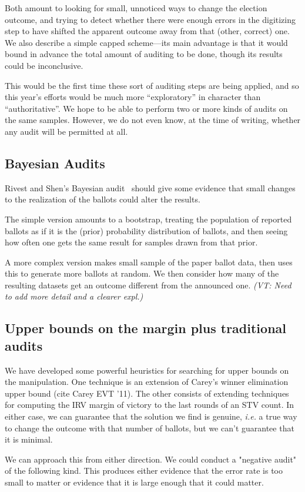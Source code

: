 \documentclass[10pt,a4paper]{article}
\newcommand{\VTNote}[1]{{\it(VT: #1)}}
\begin{document}
Both amount to looking for small, unnoticed ways to change the election outcome, and trying to detect whether there were enough errors in the digitizing step to have shifted the apparent outcome away from that (other, correct) one. We also describe a simple capped scheme---its main advantage is that it would bound in advance the total amount of auditing to be done, though its results could be inconclusive. 

This would be the first time these sort of auditing steps are
being applied, and so this year's efforts would be much more
``exploratory'' in character than ``authoritative''.  We hope to be able to perform two or more kinds of audits on the same samples.  However, we do not even know, at the time of writing, whether any audit will be permitted at all.  
\subsection{Bayesian Audits} Rivest and Shen's Bayesian audit~\cite{rivest2012bayesian} should give some evidence that small changes to the realization of the ballots could alter the results. 

The simple version amounts to a bootstrap, treating the population of reported ballots as
if it is the (prior) probability distribution of ballots, and then seeing how often one gets the same result for samples drawn from that prior. 

A more complex version makes small sample of the paper ballot data, then uses this to generate more ballots at random.  We then consider how many of the resulting datasets get an outcome different from the announced one.  \VTNote{Need to add more detail and a clearer expl.}

\subsection{Upper bounds on the margin plus traditional audits}
We have developed some powerful heuristics for searching for upper bounds on the manipulation.  One technique is an extension of Carey's winner elimination upper bound (cite Carey EVT '11).  The other consists of extending techniques for computing the IRV margin of victory to the last rounds of an STV count.  In either case, we can guarantee that the solution we find is genuine, {\it i.e.} a true way to change the outcome with that number of ballots, but we can't guarantee that it is minimal.


We can approach this from either direction. 
We could conduct a "negative audit" of the following kind.  
This produces either evidence that the error rate is too small to matter or evidence that it is large enough that it could matter.
\end{document}
